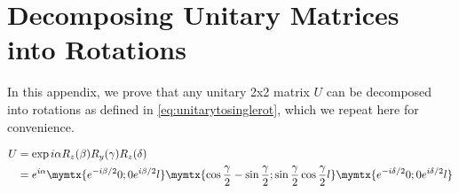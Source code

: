 \chapter{Decomposing Unitary Matrices into Rotations\label{ch:proofunitarytorot}}

In this appendix, we prove that any unitary 2x2 matrix $U$ can be decomposed into rotations as defined in \eqref{eq:unitarytosinglerot}, which we repeat here for convenience.

\begin{align}
\label{eq:toprove}
U &= \exp{i\alpha}R_z(\beta)R_y(\gamma)R_z(\delta)\\ 
&= e^{i\alpha}\mymtx{e^{-i\beta/2} 0 ; 0 e^{i\beta/2}l}
\mymtx{\cos\frac{\gamma}{2} -\sin\frac{\gamma}{2} ; \sin\frac{\gamma}{2} \cos\frac{\gamma}{2}l} 
\mymtx{e^{-i\delta/2} 0 ; 0 e^{i\delta/2}l}
\end{align}

